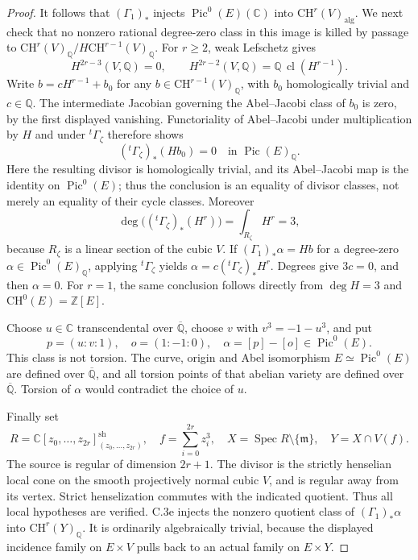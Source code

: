 \begin{proof}
It follows that $(\Gamma_1)_*$ injects
$\operatorname{Pic}^0(E)(\mathbb C)$ into
$\mathrm{CH}^r(V)_{\mathrm{alg}}$. We next check that no nonzero
rational degree-zero class in this image is killed by passage to
$\mathrm{CH}^r(V)_{\mathbb Q}/H\mathrm{CH}^{r-1}(V)_{\mathbb Q}$.
For $r\ge2$, weak Lefschetz gives
\[
 H^{2r-3}(V,\mathbb Q)=0,\qquad
 H^{2r-2}(V,\mathbb Q)=\mathbb Q\,\operatorname{cl}(H^{r-1}).
\]
Write $b=cH^{r-1}+b_0$ for any
$b\in\mathrm{CH}^{r-1}(V)_{\mathbb Q}$, with $b_0$ homologically
trivial and $c\in\mathbb Q$. The intermediate Jacobian governing
the Abel--Jacobi class of $b_0$ is zero, by the first displayed
vanishing. Functoriality of Abel--Jacobi under multiplication by
$H$ and under $ {}^t\Gamma_\zeta$ therefore shows
\[
 ({}^t\Gamma_\zeta)_*(H b_0)=0
                            \quad\text{in }\operatorname{Pic}(E)_{\mathbb Q}.
\]
Here the resulting divisor is homologically trivial, and its
Abel--Jacobi map is the identity on $\operatorname{Pic}^0(E)$;
thus the conclusion is an equality of divisor classes, not merely
an equality of their cycle classes. Moreover
\[
 \deg\bigl(({}^t\Gamma_\zeta)_*(H^r)\bigr)
       =\int_{R_\zeta}H^r=3,
\]
because $R_\zeta$ is a linear section of the cubic $V$.
If $(\Gamma_1)_*\alpha=Hb$ for a degree-zero
$\alpha\in\operatorname{Pic}^0(E)_{\mathbb Q}$, applying
$ {}^t\Gamma_\zeta$ yields
$\alpha=c({}^t\Gamma_\zeta)_*H^r$. Degrees give $3c=0$,
and then $\alpha=0$. For $r=1$, the same conclusion follows
directly from $\deg H=3$ and $\mathrm{CH}^0(E)=\mathbb Z[E]$.

Choose $u\in\mathbb C$ transcendental over $\overline{\mathbb Q}$,
choose $v$ with $v^3=-1-u^3$, and put
\[
 p=(u:v:1),\quad o=(1:-1:0),\quad
                    \alpha=[p]-[o]\in\operatorname{Pic}^0(E).
\]
This class is not torsion. The curve, origin and Abel isomorphism
$E\simeq\operatorname{Pic}^0(E)$ are defined over
$\overline{\mathbb Q}$, and all torsion points of that abelian
variety are defined over $\overline{\mathbb Q}$. Torsion of
$\alpha$ would contradict the choice of $u$.

Finally set
\[
 R=\mathbb C[z_0,\ldots,z_{2r}]_{(z_0,\ldots,z_{2r})}^{\mathrm{sh}},
 \quad f=\sum_{i=0}^{2r}z_i^3,
 \quad X=\operatorname{Spec}R\setminus\{\mathfrak m\},
 \quad Y=X\cap V(f).
\]
The source is regular of dimension $2r+1$. The divisor is the
strictly henselian local cone on the smooth projectively normal
cubic $V$, and is regular away from its vertex. Strict
henselization commutes with the indicated quotient. Thus all
local hypotheses are verified. C.3e injects the nonzero quotient
class of $(\Gamma_1)_*\alpha$ into $\mathrm{CH}^r(Y)_{\mathbb Q}$.
It is ordinarily algebraically trivial, because the displayed
incidence family on $E\times V$ pulls back to an actual family
on $E\times Y$.


\end{proof}
